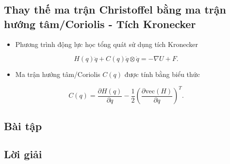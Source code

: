 \subsection{Thay thế ma trận Christoffel bằng ma trận hướng tâm/Coriolis - Tích Kronecker}

\begin{itemize}
        \item Phương trình động lực học tổng quát sử dụng tích Kronecker %
    \end{itemize}
    \begin{equation}
        H(q) \ddot{q} + C(q) \dot{q} \otimes \dot{q} = - \nabla U + F.
    \end{equation}
    \begin{itemize}
        \item Ma trận hướng tâm/Coriolis \(C(q)\) được tính bằng biểu thức
    \end{itemize}
    \begin{equation}
        C(q) = \dfrac{\partial H(q)}{\partial q} - \dfrac{1}{2} \left( \dfrac{\partial \text{vec}(H)}{\partial q} \right)^T.
    \end{equation}

\subsection{Bài tập}

\subsection{Lời giải}

